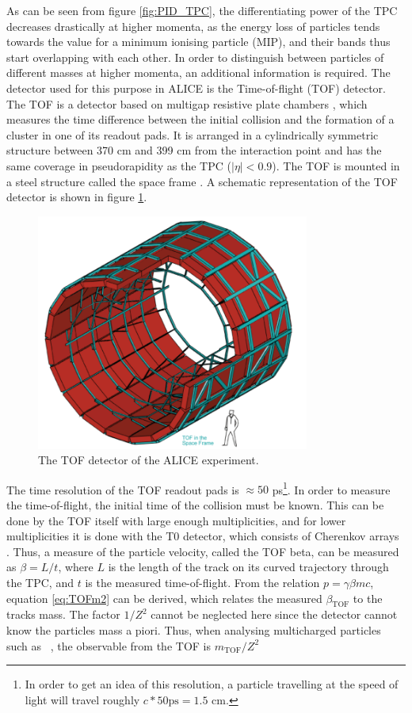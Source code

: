 As can be seen from figure \ref{fig:PID_TPC}, the differentiating power of the TPC decreases drastically at higher momenta, as the energy loss of particles tends towards the value for a minimum ionising particle (MIP), and their bands thus start overlapping with each other. In order to distinguish between particles of different masses at higher momenta, an additional information is required. The detector used for this purpose in ALICE is the Time-of-flight (TOF) detector. The TOF is a detector based on multigap resistive plate chambers \cite{ALICE_TOF_TDR}, which measures the time difference between the initial collision and the formation of a cluster in one of its readout pads. It is arranged in a cylindrically symmetric structure between 370 cm and 399 cm from the interaction point and has the same coverage in pseudorapidity as the TPC ($|\eta| < 0.9$). The TOF is mounted in a steel structure called the space frame \cite{ALICE_TOF_TDR, ALICE_overview}. A schematic representation of the TOF detector is shown in figure \ref{fig:TOF_schematic}. 

\begin{figure}
    \centering
    \includegraphics[width=0.8\textwidth]{figures/TOF.png}
    \caption{The TOF detector of the ALICE experiment.}
    \label{fig:TOF_schematic}
\end{figure}

The time resolution of the TOF readout pads is $\approx 50$ ps\footnote{In order to get an idea of this resolution, a particle travelling at the speed of light will travel roughly $c*50 \mathrm{ps} = 1.5$ cm.}. In order to measure the time-of-flight, the initial time of the collision must be known. This can be done by the TOF itself with large enough multiplicities, and for lower multiplicities it is done with the T0 detector, which consists of Cherenkov arrays \cite{ALICE_event_time}.
Thus, a measure of the particle velocity, called the TOF beta, can be measured as $\beta = L/t$, where $L$ is the length of the track on its curved trajectory through the TPC, and $t$ is the measured time-of-flight. From the relation $p = \gamma \beta mc$, equation \ref{eq:TOFm2} can be derived, which relates the measured $\beta_{\mathrm{TOF}}$ to the tracks mass. The factor $1/Z^2$ cannot be neglected here since the detector cannot know the particles mass a piori. Thus, when analysing multicharged particles such as \ahe\ , the observable from the TOF is $m_{\mathrm{TOF}}/Z^2$

